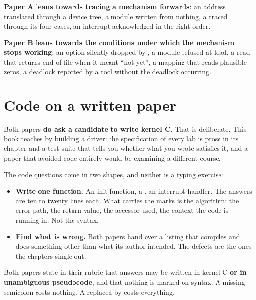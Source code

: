 \textbf{Paper A leans towards tracing a mechanism forwards}: an address translated through a device
tree, a module written from nothing, a  traced through its four cases, an interrupt
acknowledged in the right order.

\textbf{Paper B leans towards the conditions under which the mechanism stops working}: an option
silently dropped by , a module refused at load, a read that returns end of file
when it meant ``not yet'', a mapping that reads plausible zeros, a deadlock reported by a tool
without the deadlock occurring.

\section*{Code on a written paper}
Both papers \textbf{do ask a candidate to write kernel C}. That is deliberate. This book teaches by
building a driver: the specification of every lab is prose in its chapter and a test suite that
tells you whether what you wrote satisfies it, and a paper that avoided code entirely would be
examining a different course.

The code questions come in two shapes, and neither is a typing exercise:
\begin{itemize}
  \item \textbf{Write one function.} An init function, a , an interrupt handler. The
    answers are ten to twenty lines each. What carries the marks is the algorithm: the error path,
    the return value, the accessor used, the context the code is running in. Not the syntax.
  \item \textbf{Find what is wrong.} Both papers hand over a listing that compiles and does
    something other than what its author intended. The defects are the ones the chapters single
    out.
\end{itemize}
Both papers state in their rubric that answers may be written in kernel C \textbf{or in unambiguous
pseudocode}, and that nothing is marked on syntax. A missing semicolon costs nothing. A
 replaced by  costs everything.

